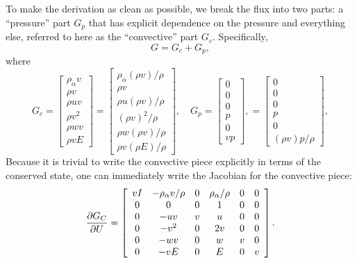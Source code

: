 To make the derivation as clean as possible, we break the flux into
two parts: a ``pressure'' part $G_p$ that has explicit dependence on
the pressure and everything else, referred to here as the
``convective'' part $G_c$.  Specifically,
%
\begin{equation*}
G = G_c + G_p,
\end{equation*}
%
where
%
\begin{equation*}
G_c = \left[ \begin{array}{c}
\rho_{\alpha} v \\
\rho v \\
\rho u v\\
\rho v^2 \\
\rho w v \\
\rho v E 
\end{array} \right]
= \left[ \begin{array}{c}
\rho_{\alpha} (\rho v) / \rho\\
\rho v \\
\rho u (\rho v) / \rho \\
(\rho v)^2 / \rho \\
\rho w (\rho v)/ \rho \\
\rho v (\rho E) / \rho 
\end{array} \right], \quad
%
G_p = \left[ \begin{array}{c}
0 \\
0 \\
0 \\
p \\
0 \\
v p
\end{array} \right], = \left[ \begin{array}{c}
0 \\
0 \\
0 \\
p \\
0 \\
(\rho v) p / \rho
\end{array} \right], 
\end{equation*}
%
Because it is trivial to write the convective piece explicitly in
terms of the conserved state, one can immediately write the Jacobian
for the convective piece:
%
\begin{equation*}
\frac{\partial G_C}{\partial U} = \left[ \begin{array}{cccccc}
v I & -\rho_{\alpha} v / \rho & 0 & \rho_{\alpha} / \rho & 0 & 0 \\
0 & 0 & 0 & 1 & 0 & 0 \\
0 & -uv & v & u & 0 & 0 \\
0 & -v^2 & 0 & 2v & 0 & 0 \\
0 & -wv & 0 & w & v & 0 \\
0 & -vE & 0 & E & 0 & v
\end{array} \right].
\end{equation*}
